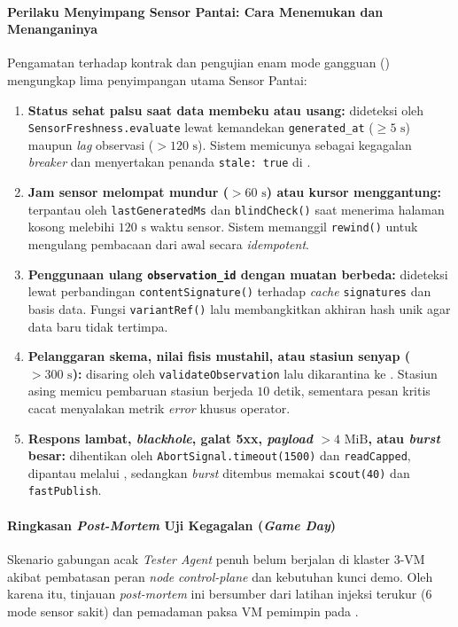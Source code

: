 \paragraph*{Perilaku Menyimpang Sensor Pantai: Cara Menemukan dan Menanganinya}
Pengamatan terhadap kontrak dan pengujian enam mode gangguan () mengungkap lima penyimpangan utama Sensor Pantai:

\begin{enumerate}
  \item \textbf{Status  sehat palsu saat data membeku atau usang:} dideteksi oleh \texttt{SensorFreshness.evaluate} lewat kemandekan \texttt{generated\_at} ($\ge 5\text{ s}$) maupun \textit{lag} observasi ($> 120\text{ s}$). Sistem memicunya sebagai kegagalan \textit{breaker} dan menyertakan penanda \texttt{stale: true} di .
  \item \textbf{Jam sensor melompat mundur ($> 60\text{ s}$) atau kursor menggantung:} terpantau oleh \texttt{lastGeneratedMs} dan \texttt{blindCheck()} saat menerima halaman kosong melebihi $120\text{ s}$ waktu sensor. Sistem memanggil \texttt{rewind()} untuk mengulang pembacaan dari awal secara \textit{idempotent}.
  \item \textbf{Penggunaan ulang \texttt{observation\_id} dengan muatan berbeda:} dideteksi lewat perbandingan \texttt{contentSignature()} terhadap \textit{cache} \texttt{signatures} dan basis data. Fungsi \texttt{variantRef()} lalu membangkitkan akhiran hash unik agar data baru tidak tertimpa.
  \item \textbf{Pelanggaran skema, nilai fisis mustahil, atau stasiun senyap ($> 300\text{ s}$):} disaring oleh \texttt{validateObservation} lalu dikarantina ke . Stasiun asing memicu pembaruan stasiun berjeda $10\text{ detik}$, sementara pesan kritis cacat menyalakan metrik \textit{error} khusus operator.
  \item \textbf{Respons lambat, \textit{blackhole}, galat 5xx, \textit{payload} $> 4\text{ MiB}$, atau \textit{burst} besar:} dihentikan oleh \texttt{AbortSignal.timeout(1500)} dan \texttt{readCapped}, dipantau melalui , sedangkan \textit{burst} ditembus memakai \texttt{scout(40)} dan \texttt{fastPublish}.
\end{enumerate}

\paragraph*{Ringkasan \textit{Post-Mortem} Uji Kegagalan (\textit{Game Day})}
Skenario gabungan acak \textit{Tester Agent} penuh belum berjalan di klaster 3-VM akibat pembatasan peran \textit{node} \textit{control-plane} dan kebutuhan kunci demo. Oleh karena itu, tinjauan \textit{post-mortem} ini bersumber dari latihan injeksi terukur  (6 mode sensor sakit) dan pemadaman paksa VM pemimpin pada .

